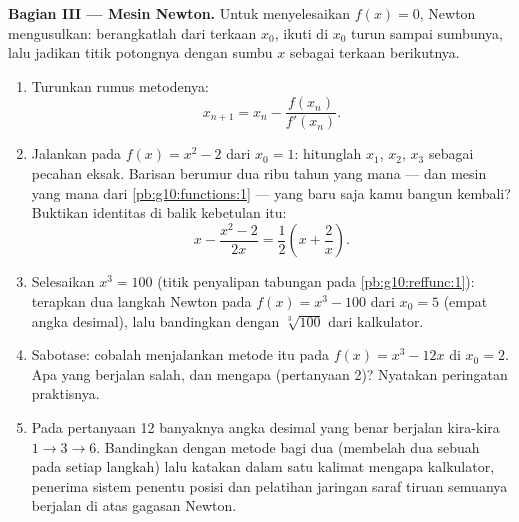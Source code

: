 \begin{problem}
\medskip
\noindent\textbf{Bagian III --- Mesin Newton.}
Untuk menyelesaikan $f(x) = 0$, Newton mengusulkan: berangkatlah dari terkaan
$x_0$, ikuti  di $x_0$ turun sampai sumbunya, lalu jadikan
titik potongnya dengan sumbu $x$ sebagai terkaan berikutnya.
\begin{enumerate}[resume]
  \item Turunkan rumus metodenya:
        \[
        x_{n + 1} = x_n - \frac{f(x_n)}{f'(x_n)} .
        \]
  \item Jalankan pada $f(x) = x^2 - 2$ dari $x_0 = 1$: hitunglah
        $x_1$, $x_2$, $x_3$ sebagai pecahan eksak. Barisan berumur
        dua ribu tahun yang mana --- dan mesin yang mana
        dari \cref{pb:g10:functions:1} --- yang baru saja kamu
        bangun kembali? Buktikan identitas di balik kebetulan itu:
        \[
        x - \frac{x^2 - 2}{2x} = \frac12\left(x +
        \frac2x\right).
        \]
  \item Selesaikan $x^3 = 100$ (titik penyalipan tabungan pada
        \cref{pb:g10:reffunc:1}): terapkan dua langkah Newton pada
        $f(x) = x^3 - 100$ dari $x_0 = 5$ (empat angka desimal), lalu
        bandingkan dengan $\sqrt[3]{100}$ dari kalkulator.
  \item Sabotase: cobalah menjalankan metode itu pada
        $f(x) = x^3 - 12x$ di $x_0 = 2$. Apa yang berjalan salah, dan
        mengapa (pertanyaan 2)? Nyatakan peringatan praktisnya.
  \item Pada pertanyaan 12 banyaknya angka desimal yang benar berjalan
        kira-kira $1 \to 3 \to 6$. Bandingkan dengan metode bagi dua
        (membelah dua sebuah  pada setiap langkah) lalu katakan dalam
        satu kalimat mengapa kalkulator, penerima sistem penentu posisi dan
        pelatihan jaringan saraf tiruan semuanya berjalan di atas gagasan
        Newton.
\end{enumerate}


\end{problem}
